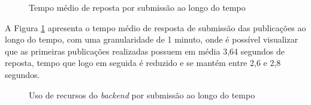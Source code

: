 \begin{figure}[H]
    \caption{Tempo médio de reposta por submissão ao longo do tempo}
    \centering
    \label{fig:create-response-over-time}
\end{figure}

A Figura \ref{fig:create-response-over-time} apresenta o tempo médio de resposta
de submissão das publicações ao longo do tempo, com uma granularidade de 1 minuto,
onde é possível visualizar que as primeiras publicações realizadas possuem em média
3,64 segundos de reposta, tempo que logo em seguida é reduzido e se mantém entre 2,6
e 2,8 segundos.

\begin{figure}[H]
    \caption{Uso de recursos do \emph{backend} por submissão ao longo do tempo}
    \centering
    \label{fig:resource-usage-create-research}
\end{figure}


